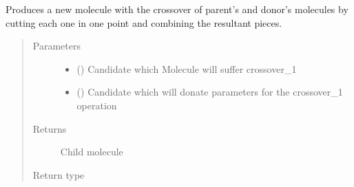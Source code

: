 \documentclass[letterpaper,10pt,english]{sphinxmanual}
\begin{document}
\begin{fulllineitems}
\begin{fulllineitems}
\label{\detokenize{MolOpt:MolOpt.MolOpt.MolOpt.crossover_1}}
\sphinxAtStartPar
Produces a new molecule with the crossover of parent’s and donor’s molecules by cutting each one in one point
and combining the resultant pieces.
\begin{quote}\begin{description}
\item[{Parameters}] \leavevmode\begin{itemize}
\item {} 
\sphinxAtStartPar
{} ({\hyperref[\detokenize{MolOpt.genetic:MolOpt.genetic.genetic.Chromosome}]{}}) \textendash{} Candidate which Molecule will suffer crossover\_1

\item {} 
\sphinxAtStartPar
{} ({\hyperref[\detokenize{MolOpt.genetic:MolOpt.genetic.genetic.Chromosome}]{}}) \textendash{} Candidate which will donate parameters for the crossover\_1 operation

\end{itemize}

\item[{Returns}] \leavevmode
\sphinxAtStartPar
Child molecule

\item[{Return type}] \leavevmode
\sphinxAtStartPar
{\hyperref[\detokenize{MolOpt.molecular:MolOpt.molecular.molecular.Molecule}]{}}

\end{description}\end{quote}

\end{fulllineitems}


\end{fulllineitems}
\end{document}
